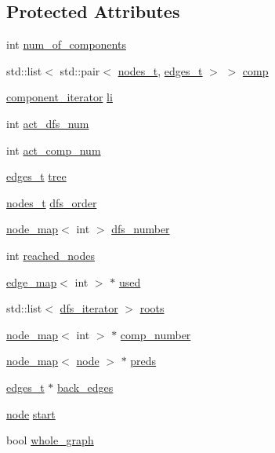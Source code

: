 \subsection*{Protected Attributes}
\begin{DoxyCompactItemize}
\item 
int \mbox{\hyperlink{classcomponents_ad5a54d7313e23f8c6a2c6347e6ee70a0}{num\+\_\+of\+\_\+components}}
\item 
std\+::list$<$ std\+::pair$<$ \mbox{\hyperlink{edge_8h_a22ac17689106ba21a84e7bc54d1199d6}{nodes\+\_\+t}}, \mbox{\hyperlink{edge_8h_a8f9587479bda6cf612c103494b3858e3}{edges\+\_\+t}} $>$ $>$ \mbox{\hyperlink{classcomponents_a99483a9e5f031e6e6e2e5b0c47c2979e}{comp}}
\item 
\mbox{\hyperlink{classcomponents_a0954ef13f83f3c1ac6cd4474cac17a36}{component\+\_\+iterator}} \mbox{\hyperlink{classcomponents_ae88ffb062b1ea4931ecfaa53e871825f}{li}}
\item 
int \mbox{\hyperlink{classdfs_aedaf2b485ff83150b1de6c305922473b}{act\+\_\+dfs\+\_\+num}}
\item 
int \mbox{\hyperlink{classdfs_ab0251ac30adfd569e214a64db7f3a905}{act\+\_\+comp\+\_\+num}}
\item 
\mbox{\hyperlink{edge_8h_a8f9587479bda6cf612c103494b3858e3}{edges\+\_\+t}} \mbox{\hyperlink{classdfs_aed496b618a937723bfec0b463e17e8d5}{tree}}
\item 
\mbox{\hyperlink{edge_8h_a22ac17689106ba21a84e7bc54d1199d6}{nodes\+\_\+t}} \mbox{\hyperlink{classdfs_af70a73ace68afd91ef944f984c9f28d5}{dfs\+\_\+order}}
\item 
\mbox{\hyperlink{classnode__map}{node\+\_\+map}}$<$ int $>$ \mbox{\hyperlink{classdfs_a99727f2274d6af63daae4f0518f3adbe}{dfs\+\_\+number}}
\item 
int \mbox{\hyperlink{classdfs_acb11186a1a2a2a1f38cdc0674340ba37}{reached\+\_\+nodes}}
\item 
\mbox{\hyperlink{classedge__map}{edge\+\_\+map}}$<$ int $>$ $\ast$ \mbox{\hyperlink{classdfs_afc18288747491be301d6d8d85d8f220b}{used}}
\item 
std\+::list$<$ \mbox{\hyperlink{classdfs_a15fe023a5a1f7ddda00f3d87110d9a32}{dfs\+\_\+iterator}} $>$ \mbox{\hyperlink{classdfs_a0bbd5cb8df26c891b74dadd84b46a06b}{roots}}
\item 
\mbox{\hyperlink{classnode__map}{node\+\_\+map}}$<$ int $>$ $\ast$ \mbox{\hyperlink{classdfs_a00db016ac7eab69045cae408008890c1}{comp\+\_\+number}}
\item 
\mbox{\hyperlink{classnode__map}{node\+\_\+map}}$<$ \mbox{\hyperlink{classnode}{node}} $>$ $\ast$ \mbox{\hyperlink{classdfs_a3fdeb5a211a1bc1753b2a637258c5355}{preds}}
\item 
\mbox{\hyperlink{edge_8h_a8f9587479bda6cf612c103494b3858e3}{edges\+\_\+t}} $\ast$ \mbox{\hyperlink{classdfs_a1dc18a7df8d6b238d5301c92fc7540fa}{back\+\_\+edges}}
\item 
\mbox{\hyperlink{classnode}{node}} \mbox{\hyperlink{classdfs_af677cfc31fe06a18dd3a3aae7f7d112b}{start}}
\item 
bool \mbox{\hyperlink{classdfs_ab8342c80ab208ef0e0d781f0769d0d95}{whole\+\_\+graph}}
\end{DoxyCompactItemize}


